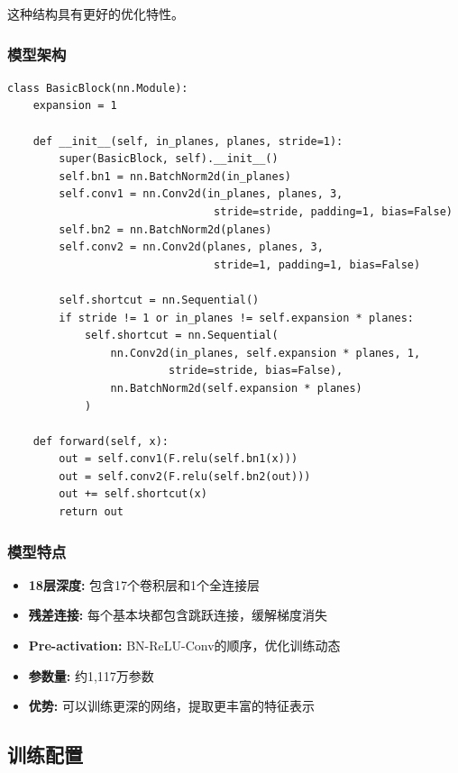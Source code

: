 \documentclass[12pt,a4paper]{article}
\begin{document}
这种结构具有更好的优化特性\cite{he2016identity}。

\subsubsection{模型架构}

\begin{lstlisting}[caption={ResNet-18基本模块},label={lst:resnet}]
class BasicBlock(nn.Module):
    expansion = 1
    
    def __init__(self, in_planes, planes, stride=1):
        super(BasicBlock, self).__init__()
        self.bn1 = nn.BatchNorm2d(in_planes)
        self.conv1 = nn.Conv2d(in_planes, planes, 3, 
                                stride=stride, padding=1, bias=False)
        self.bn2 = nn.BatchNorm2d(planes)
        self.conv2 = nn.Conv2d(planes, planes, 3, 
                                stride=1, padding=1, bias=False)
        
        self.shortcut = nn.Sequential()
        if stride != 1 or in_planes != self.expansion * planes:
            self.shortcut = nn.Sequential(
                nn.Conv2d(in_planes, self.expansion * planes, 1,
                         stride=stride, bias=False),
                nn.BatchNorm2d(self.expansion * planes)
            )
            
    def forward(self, x):
        out = self.conv1(F.relu(self.bn1(x)))
        out = self.conv2(F.relu(self.bn2(out)))
        out += self.shortcut(x)
        return out
\end{lstlisting}

\subsubsection{模型特点}

\begin{itemize}[leftmargin=2em]
    \item \textbf{18层深度:} 包含17个卷积层和1个全连接层
    \item \textbf{残差连接:} 每个基本块都包含跳跃连接，缓解梯度消失
    \item \textbf{Pre-activation:} BN-ReLU-Conv的顺序，优化训练动态
    \item \textbf{参数量:} 约1,117万参数
    \item \textbf{优势:} 可以训练更深的网络，提取更丰富的特征表示
\end{itemize}

\subsection{训练配置}
\end{document}

